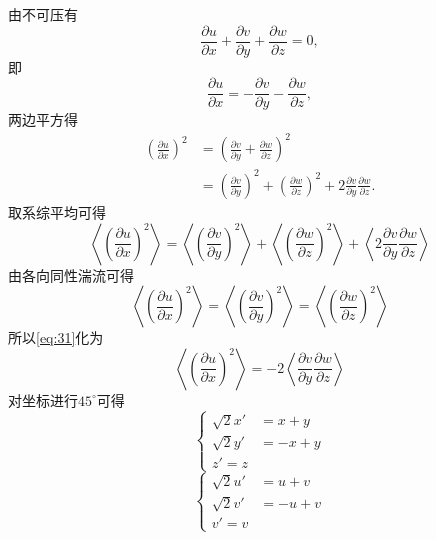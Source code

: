 \documentclass[12pt,a4]{ctexart}
\begin{document}
由不可压有
\begin{equation}
   \frac{\partial u}{\partial x} + \frac{\partial v}{\partial y} + \frac{\partial w}{\partial z} = 0,
\end{equation}
即
\begin{equation}
   \frac{\partial u}{\partial x} = - \frac{\partial v}{\partial y} - \frac{\partial w}{\partial z},
\end{equation}
两边平方得
\begin{equation}
   \begin{aligned}
	  \left( \frac{\partial u}{\partial x} \right)^2 & =  \left( \frac{\partial v}{\partial y} + \frac{\partial w}{\partial z} \right)^2                                                                                   \\
													 & = \left( \frac{\partial v}{\partial y}  \right)^2 + \left( \frac{\partial w}{\partial z}  \right)^2 + 2\frac{\partial v}{\partial y} \frac{\partial w}{\partial z}.
   \end{aligned}
\end{equation}
取系综平均可得
\begin{equation}
   \left< \left( \frac{\partial u}{\partial x} \right)^2 \right> = \left<\left( \frac{\partial v}{\partial y}  \right)^2 \right> + \left<\left( \frac{\partial w}{\partial z}  \right)^2 \right> + \left<2\frac{\partial v}{\partial y} \frac{\partial w}{\partial z}
   \right>
   \label{eq:31}
\end{equation}
由各向同性湍流可得\cite{10.2307/96557}
\begin{equation}
   \left< \left( \frac{\partial u}{\partial x} \right)^2 \right> =\left< \left( \frac{\partial v}{\partial y} \right)^2 \right> =\left< \left( \frac{\partial w}{\partial z} \right)^2 \right>
\end{equation}
所以\cref{eq:31}化为
\begin{equation}
   \left< \left( \frac{\partial u}{\partial x} \right)^2 \right> = -2 \left<\frac{\partial v}{\partial y} \frac{\partial w}{\partial z}
   \right>
\end{equation}
对坐标进行$45^{\circ}$可得
\begin{equation}
   \begin{cases}
	  \sqrt{2} x' & = x + y  \\
	  \sqrt{2} y' & = -x + y \\
	  z' = z
   \end{cases}
   \label{eq:32}
\end{equation}
\begin{equation}
   \begin{cases}
	  \sqrt{2} u' & = u + v  \\
	  \sqrt{2} v' & = -u + v \\
	  v' = v
   \end{cases}
\end{equation}
\end{document}
